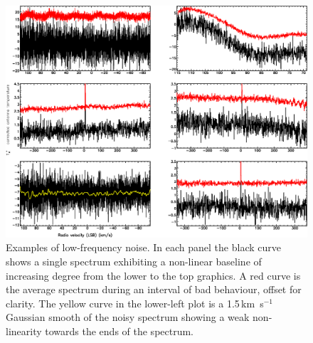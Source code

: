 \documentclass[useAMS,usenatbib]{mn2e}
\begin{document}
\begin{figure}
\includegraphics[width=\textwidth]{examples_non-linear_baselines.pdf}
\caption{Examples of low-frequency noise.  In each panel the
  black curve shows a single spectrum exhibiting a non-linear baseline
  of increasing degree from the lower to the top graphics.  A red curve
  is the average spectrum during an interval of bad behaviour, offset
  for clarity.  The yellow curve in the lower-left plot is a
  1.5\,km~s$^{-1}$ Gaussian smooth of the noisy spectrum showing a
  weak non-linearity towards the ends of the spectrum.}
\label{fig:badbase:interference}
\end{figure}
\end{document}
